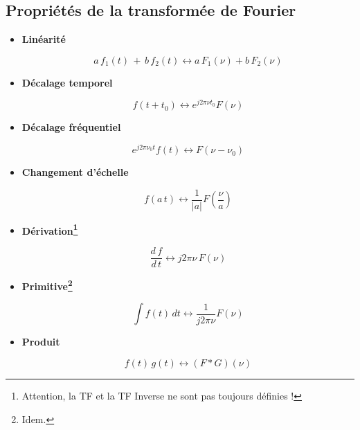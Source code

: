 \subsection*{Propriétés de la transformée de Fourier}
\bigskip
\begin{itemize}
\item \textbf{Linéarité} 

\begin{equation}
a\,f_1(t)\,+\,b\,f_2(t) \leftrightarrow a\,F_1(\nu) + b\,F_2(\nu) 
\end{equation}

\item \textbf{Décalage temporel} 

\begin{equation}
f(t+t_0) \leftrightarrow e^{j2\pi\nu t_0}F(\nu)
\end{equation}

\item \textbf{Décalage fréquentiel} 

\begin{equation}
	e^{j2\pi\nu_0t}f(t) \leftrightarrow F(\nu-\nu_0)
\end{equation}

\item \textbf{Changement d'échelle} 

\begin{equation}
f(a\,t) \leftrightarrow \dfrac{1}{\left| a \right|} F\left( \dfrac{\nu}{a}\right)
\end{equation}

\item \textbf{Dérivation\footnote{Attention, la TF et la TF Inverse ne sont pas toujours définies !}}

\begin{equation}
	\dfrac{d\,f}{d\,t} \leftrightarrow j2\pi\nu\,F(\nu)
\end{equation}

\item \textbf{Primitive\footnote{Idem.}}

\begin{equation}
\int f(t)\,dt \leftrightarrow \dfrac{1}{j2\pi\nu}F(\nu)
\end{equation}

\item \textbf{Produit}

\begin{equation}
	f(t) \, g(t) \leftrightarrow \left( F \ast G \right)(\nu)
\end{equation}


\end{itemize}
